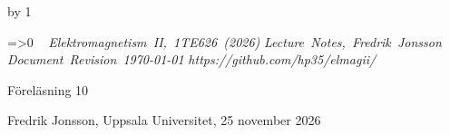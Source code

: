 {{{{{\cleardoublepage
%
%
%
%
%
%
%
\def\coursename{Elektromagnetism II}
\def\coursecode{1TE626}
\def\courseyear{2026}
\def\courserepo{https://github.com/hp35/elmagii/}
\def\lecturenumber{10}
\def\lecturetitle{V{\aa}gutbredning i homogena och isotropa dielektrika}
\def\lecturesubtitle{}
\def\lectureauthor{Fredrik Jonsson}
\def\lectureplace{Uppsala Universitet}
\def\lecturedate{25 november 2026}
\edef\expandedlecturenumber{10}
\def\ifempty#1{\ifx\relax#1\relax}
\advance\chapno by 1
\immediate{}
\hsize=150mm\hoffset=4.6mm\vsize=230mm\voffset=7mm
\topskip=0pt\baselineskip=12pt\parskip=0pt\leftskip=0pt\parindent=15pt
\ifcolors
  \voffset=-10.2mm\topskip=0pt
\fi
\headline={\ifnum\secno>0\ifodd\pageno\rightheadline\else\leftheadline\fi
  \else\hfill\fi}
\def\rightheadline{\tenrm{\it F\"orel\"asning 10}
  \hfil{\it \coursename, \coursecode\ (\courseyear)}}
\def\leftheadline{\tenrm{\it \coursename, \coursecode\ (\courseyear)}
  \hfil{\it F\"orel\"asning 10}}
\noindent~\vskip-60pt\hskip-40pt{}
\vskip-42pt\hfill\vbox{
    \hbox{{\it \coursename, \coursecode\ (\courseyear)}}
    \hbox{{\it Lecture Notes, \lectureauthor}}
    \hbox{{\it Document Revision \today}}
    \hbox{{\it \courserepo}}}\vskip 36pt
\centerline{\twelvesc F\"orel\"asning 10}
\vskip 24pt\noindent
\centerline{}
\expandafter\ifempty\expandafter{\lecturesubtitle}%
  \else\centerline{\twelvesc\lecturesubtitle}\fi
\bigskip
\centerline{\lectureauthor, \lectureplace, \lecturedate}
\vskip24pt



}}}}}
